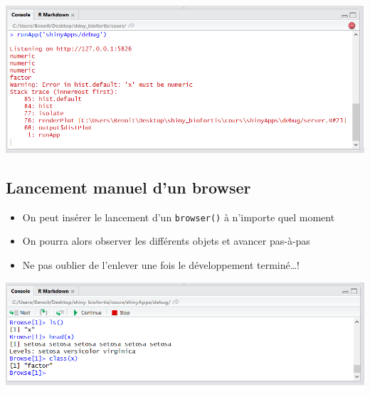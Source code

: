 \documentclass[]{article}
\newenvironment{Shaded}{\begin{snugshade}}{\end{snugshade}}
\newcommand{\KeywordTok}[1]{\textcolor[rgb]{0.13,0.29,0.53}{\textbf{#1}}}
\newcommand{\StringTok}[1]{\textcolor[rgb]{0.31,0.60,0.02}{#1}}
\newcommand{\CommentTok}[1]{\textcolor[rgb]{0.56,0.35,0.01}{\textit{#1}}}
\newcommand{\OperatorTok}[1]{\textcolor[rgb]{0.81,0.36,0.00}{\textbf{#1}}}
\newcommand{\NormalTok}[1]{#1}
\providecommand{\tightlist}{%
  \setlength{\itemsep}{0pt}\setlength{\parskip}{0pt}}
\begin{document}
\includegraphics{img/debug_cat.png}

\subsection{Lancement manuel d'un
browser}\label{lancement-manuel-dun-browser}

\begin{itemize}
\tightlist
\item
  On peut insérer le lancement d'un \texttt{browser()} à n'importe quel
  moment
\item
  On pourra alors observer les différents objets et avancer pas-à-pas
\end{itemize}

\begin{Shaded}
\end{Shaded}

\begin{itemize}
\tightlist
\item
  Ne pas oublier de l'enlever une fois le développement terminé\ldots{}!
\end{itemize}

\includegraphics{img/debug_browser.png}
\end{document}
